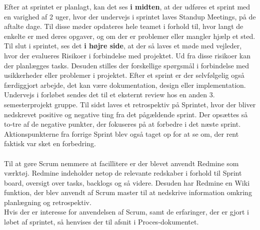 \documentclass[Rapport/Rapport_main.tex]{subfiles}
\begin{document}
Efter at sprintet er planlagt, kan det ses \textbf{i midten}, at der udføres et sprint med en varighed af 2 uger, hvor der undervejs i sprintet laves Standup Meetings, på de aftalte dage. Til disse møder opdateres hele teamet i forhold til, hvor langt de enkelte er med deres opgaver, og om der er problemer eller mangler hjælp et sted.\\
Til slut i sprintet, ses det \textbf{i højre side}, at der så laves et møde med vejleder, hvor der evalueres Risikoer i forbindelse med projektet. Ud fra disse risikoer kan der planlægges tasks. Desuden stilles der forskellige spørgsmål i forbindelse med usikkerheder eller problemer i projektet. Efter et sprint er der selvfølgelig også færdiggjort arbejde, det kan være dokumentation, design eller implementation. Undervejs i forløbet sendes det til et eksternt review hos en anden 3. semesterprojekt gruppe. Til sidst laves et retrospektiv på Sprintet, hvor der bliver nedskrevet positive og negative ting fra det pågældende sprint. Der opsættes så to-tre af de negative punkter, der fokuseres på at forbedre i det næste sprint. Aktionspunkterne fra forrige Sprint blev også taget op for at se om, der rent faktisk var sket en forbedring.\\\\
Til at gøre Scrum nemmere at facillitere er der blevet anvendt Redmine som værktøj. Redmine indeholder netop de relevante redskaber i forhold til Sprint board, oversigt over tasks, backlogs og så videre. Desuden har Redmine en Wiki funktion, der blev anvendt af Scrum master til at nedskrive information omkring planlægning og retrospektiv.\\
Hvis der er interesse for anvendelsen af Scrum, samt de erfaringer, der er gjort i løbet af sprintet, så henvises der til afsnit  i Proces-dokumentet.
\end{document}
